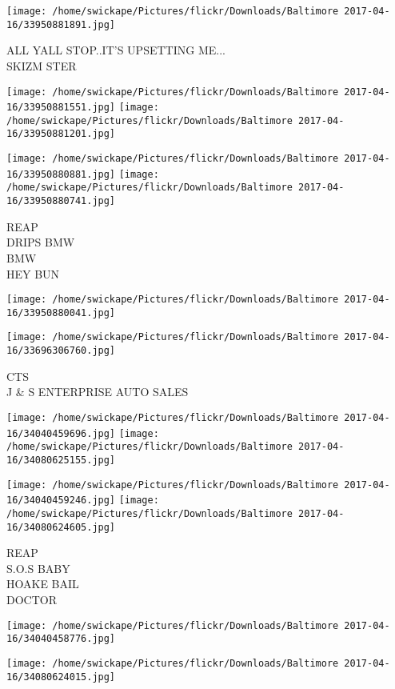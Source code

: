 \documentclass[10pt,letterpaper]{article}
\begin{document}
\vspace{0.25in}
\texttt{[image: /home/swickape/Pictures/flickr/Downloads/Baltimore 2017-04-16/33950881891.jpg]}

ALL YALL STOP..IT'S UPSETTING ME...\\
SKIZM STER
\pagebreak

\texttt{[image: /home/swickape/Pictures/flickr/Downloads/Baltimore 2017-04-16/33950881551.jpg]}
\texttt{[image: /home/swickape/Pictures/flickr/Downloads/Baltimore 2017-04-16/33950881201.jpg]}

\texttt{[image: /home/swickape/Pictures/flickr/Downloads/Baltimore 2017-04-16/33950880881.jpg]}
\texttt{[image: /home/swickape/Pictures/flickr/Downloads/Baltimore 2017-04-16/33950880741.jpg]}

REAP\\
DRIPS BMW\\
BMW\\
HEY BUN
\pagebreak

\texttt{[image: /home/swickape/Pictures/flickr/Downloads/Baltimore 2017-04-16/33950880041.jpg]}

\vspace{0.25in}
\texttt{[image: /home/swickape/Pictures/flickr/Downloads/Baltimore 2017-04-16/33696306760.jpg]}

CTS\\
J \& S ENTERPRISE AUTO SALES
\pagebreak

\texttt{[image: /home/swickape/Pictures/flickr/Downloads/Baltimore 2017-04-16/34040459696.jpg]}
\texttt{[image: /home/swickape/Pictures/flickr/Downloads/Baltimore 2017-04-16/34080625155.jpg]}

\texttt{[image: /home/swickape/Pictures/flickr/Downloads/Baltimore 2017-04-16/34040459246.jpg]}
\texttt{[image: /home/swickape/Pictures/flickr/Downloads/Baltimore 2017-04-16/34080624605.jpg]}

REAP\\
S.O.S BABY\\
HOAKE BAIL\\
DOCTOR
\pagebreak

\texttt{[image: /home/swickape/Pictures/flickr/Downloads/Baltimore 2017-04-16/34040458776.jpg]}

\vspace{0.25in}
\texttt{[image: /home/swickape/Pictures/flickr/Downloads/Baltimore 2017-04-16/34080624015.jpg]}
\end{document}
